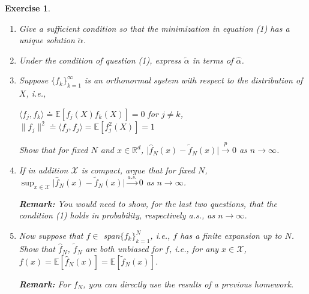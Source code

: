 \documentclass[12pt]{article}
\theoremstyle{colon}
\newtheorem{exercise}{Exercise}
\begin{document}
\begin{exercise}
  \begin{enumerate}[label=\arabic*)]
    \item Give a sufficient condition so that the minimization in equation (1) has a unique solution $\tilde{\alpha}$.
    \item Under the condition of question (1), express $\tilde{\alpha}$ in terms of $\widehat{\alpha}$.
    \item Suppose $\{f_k\}_{k=1}^\infty$ is an orthonormal system with respect to the distribution of $X$, i.e.,
      \begin{center}
        $\langle f_j, f_k \rangle \doteq \mathbb{E}[ f_j(X)f_k(X)] = 0$ for $j \neq k$, $\lVert f_j \rVert^2 \doteq \langle f_j, f_j \rangle = \mathbb{E}[f_j^2(X)] = 1$
      \end{center}
      Show that for fixed $N$ and $x \in \mathbb{R}^d$, $\lvert \widehat{f}_N(x) - \tilde{f}_N(x) \rvert \xrightarrow{p} 0$ as $n \rightarrow \infty$.
    \item If in addition $\mathcal{X}$ is compact, argue that for fixed $N$, $\sup_{x \in \mathcal{X}} \lvert \widehat{f}_N(x) - \tilde{f}_N(x) \rvert \xrightarrow{a.s.} 0$ as $n \rightarrow \infty$.

      \textbf{Remark:} \textit{You would need to show, for the last two questions, that the condition (1) holds in probability, respectively a.s., as $n \rightarrow \infty$}.
    \item Now suppose that $f \in $ span$\{f_k\}_{k=1}^N$, i.e., $f$ has a finite expansion up to $N$. Show that $\widehat{f}_N$, $\tilde{f}_N$ are both unbiased for $f$, i.e., for any $x \in \mathcal{X}$, $f(x) = \mathbb{E}[\widehat{f}_N(x)] = \mathbb{E}[\tilde{f}_N(x)]$.

      \textbf{Remark:} \textit{For $\widehat{f}_N$}, you can directly use the results of a previous homework.
  \end{enumerate}
\end{exercise}
\end{document}
